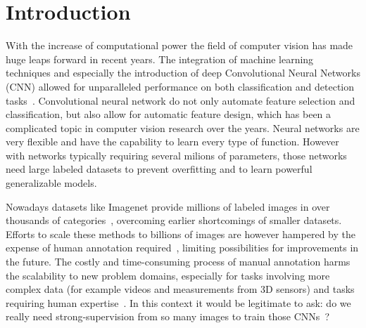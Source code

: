 %

% 

\chapter{Introduction}
With the increase of computational power the field of computer vision has made huge leaps forward in recent years. The integration of machine learning techniques and especially the introduction of deep Convolutional Neural Networks (CNN) allowed for unparalleled performance on both classification and detection tasks~\cite{krizhevsky2012}. Convolutional neural network do not only automate feature selection and classification, but also allow for automatic feature design, which has been a complicated topic in computer vision research over the years. Neural networks are very flexible and have the capability to learn every type of function. However with networks typically requiring several milions of parameters, those networks need large labeled datasets to prevent overfitting and to learn powerful generalizable models.

Nowadays datasets like Imagenet provide millions of labeled images in over thousands of categories~\cite{deng2009}, overcoming earlier shortcomings of smaller datasets. Efforts to scale these methods to billions of images are however hampered by the expense of human annotation required~\cite{doersch2015}, limiting possibilities for improvements in the future. The costly and time-consuming process of manual annotation harms the scalability to new problem domains, especially for tasks involving more complex data (for example videos and measurements from 3D sensors) and tasks requiring human expertise~\cite{lee2017,fernando2017}. In this context it would be legitimate to ask: do we really need strong-supervision from so many images to train those CNNs~\cite{wang2015}?

